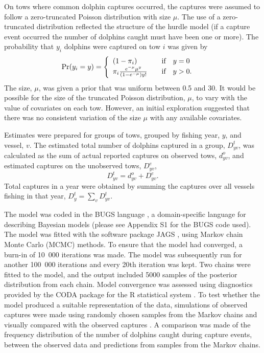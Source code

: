\documentclass[10pt]{article}
\begin{document}
On tows where common dolphin captures occurred, 
the captures were assumed to follow a zero-truncated Poisson distribution with size $\mu$.
The use of a zero-truncated distribution reflected the structure of
the hurdle model (if a capture event occurred 
the number of dolphins caught must have been one or more). The probability that $y_i$ dolphins were captured on tow $i$ was given by
\begin{align*}
\textrm{Pr}(y_i = y) &= \left\{
\begin{array}{l l}
(1 - \pi_i) & \quad \mbox{if} \quad y = 0 \\
\pi_i{ e^{-\mu}\mu^y \over (1-e^{-\mu})y!} & \quad\mbox{if} \quad y > 0 .\\
\end{array} \right.
\end{align*}
The size, $\mu$, was given a
prior that was uniform between 0.5 and 30. 
It would be possible for the size of the truncated Poisson distribution, $\mu$, to vary with the
value of covariates on each tow.  However, an initial exploration suggested that there
was no consistent variation of the size $\mu$ with any available covariates.

Estimates were prepared for groups of tows, grouped by
fishing year, $y$,  and vessel, $v$. The estimated total number of dolphins captured in a group,
$D^t_{yv}$, was calculated as the sum of actual reported captures on observed tows,
$d^o_{yv}$, and estimated captures on the unobserved tows, $D^e_{yv}$, 
\begin{equation}
 D^t_{yv} = d^o_{yv} + D^e_{yv}.
\label{eq:total-estimate}
\end{equation}
Total captures in a year were obtained by summing the captures over all vessels fishing in that year, $D^t_y = \sum_v D^t_{yv}$.

The model was coded in the BUGS language \cite{spiegelhalter_winbugs_2003}, a domain-specific language for describing Bayesian models (please see Appendix S1 for the BUGS code used).  The model was fitted with the software
package JAGS
\cite{plummer_jags_2005}, using Markov chain Monte Carlo (MCMC) methods. To 
ensure that the model had converged, a burn-in of 10~000 iterations was made.
The model was subsequently run for another 100~000 iterations and every
20th iteration was kept. Two chains were fitted to the model, and the
output included 5000 samples of the posterior distribution from each chain.
Model convergence was assessed using diagnostics provided by the CODA package for
the R statistical system \cite{plummer_coda_2006}. 
To test whether the model produced a suitable representation of the data,
simulations of observed captures were made using randomly chosen samples from the Markov chains and visually compared
with the observed captures \cite{gelman_data_2006}. A comparison was made of the frequency distribution of 
the number of dolphins caught during capture events, between the observed data and predictions from samples from the Markov chains.
\end{document}
